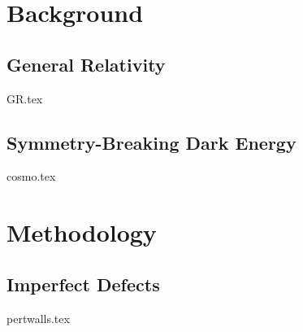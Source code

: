 \documentclass[UKenglish]{texmex/uiomasterthesis}
\begin{document}

\part{Background}\label{part:bckg}


\chapter{General Relativity}\label{chap:GR}
    {{GR.tex}}

\chapter{Symmetry-Breaking Dark Energy}\label{chap:cosmo}
    {{cosmo.tex}}













\part{Methodology}\label{part:method}




\chapter{Imperfect Defects}\label{chap:pertwalls}
    {{pertwalls.tex}}
\end{document}
